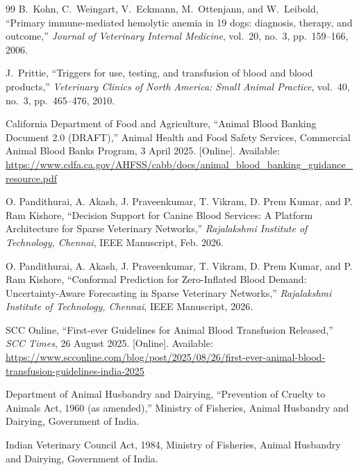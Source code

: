 \documentclass[12pt,a4paper]{article}
\begin{document}
\begin{thebibliography}{99}
B.~Kohn, C.~Weingart, V.~Eckmann, M.~Ottenjann, and W.~Leibold,
``Primary immune-mediated hemolytic anemia in 19 dogs: diagnosis, therapy,
and outcome,''
\textit{Journal of Veterinary Internal Medicine},
vol.~20, no.~3, pp.~159--166, 2006.

J.~Prittie,
``Triggers for use, testing, and transfusion of blood and blood products,''
\textit{Veterinary Clinics of North America: Small Animal Practice},
vol.~40, no.~3, pp.~465--476, 2010.

California Department of Food and Agriculture,
``Animal Blood Banking Document 2.0 (DRAFT),''
Animal Health and Food Safety Services, Commercial Animal Blood Banks
Program, 3 April 2025. [Online]. Available:
\url{https://www.cdfa.ca.gov/AHFSS/cabb/docs/animal_blood_banking_guidance_resource.pdf}

O. Pandithurai, A. Akash, J. Praveenkumar, T. Vikram, D. Prem Kumar, and P. Ram Kishore, 
``Decision Support for Canine Blood Services: A Platform Architecture for Sparse Veterinary Networks,'' 
\textit{Rajalakshmi Institute of Technology, Chennai}, IEEE Manuscript, Feb. 2026.

O. Pandithurai, A. Akash, J. Praveenkumar, T. Vikram, D. Prem Kumar, and P. Ram Kishore, 
``Conformal Prediction for Zero-Inflated Blood Demand: Uncertainty-Aware Forecasting in Sparse Veterinary Networks,'' 
\textit{Rajalakshmi Institute of Technology, Chennai}, IEEE Manuscript, 2026.

SCC Online, ``First-ever Guidelines for Animal Blood Transfusion Released,'' 
\textit{SCC Times}, 26 August 2025. [Online]. Available: 
\url{https://www.scconline.com/blog/post/2025/08/26/first-ever-animal-blood-transfusion-guidelines-india-2025}

Department of Animal Husbandry and Dairying, ``Prevention of Cruelty to Animals Act, 1960 (as amended),'' 
Ministry of Fisheries, Animal Husbandry and Dairying, Government of India.

Indian Veterinary Council Act, 1984, 
Ministry of Fisheries, Animal Husbandry and Dairying, Government of India.

\end{thebibliography}
\end{document}
